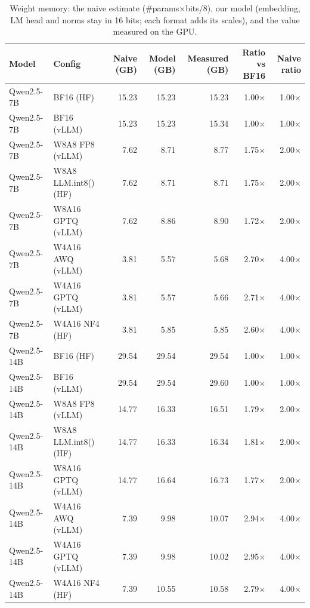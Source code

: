 \begin{table}[htbp]
\centering
\footnotesize
\caption{Weight memory: the naive estimate ($\#$params$\times$bits/8), our model (embedding, LM head and norms stay in 16 bits; each format adds its scales), and the value measured on the GPU.}
\label{tab:weights}
\setlength{\tabcolsep}{4pt}
\begin{tabular}{llrrrrr}
\toprule
Model & Config & Naive (GB) & Model (GB) & Measured (GB) & Ratio vs BF16 & Naive ratio \\
\midrule
Qwen2.5-7B & BF16 (HF) & 15.23 & 15.23 & 15.23 & 1.00$\times$ & 1.00$\times$ \\
Qwen2.5-7B & BF16 (vLLM) & 15.23 & 15.23 & 15.34 & 1.00$\times$ & 1.00$\times$ \\
Qwen2.5-7B & W8A8 FP8 (vLLM) & 7.62 & 8.71 & 8.77 & 1.75$\times$ & 2.00$\times$ \\
Qwen2.5-7B & W8A8 LLM.int8() (HF) & 7.62 & 8.71 & 8.71 & 1.75$\times$ & 2.00$\times$ \\
Qwen2.5-7B & W8A16 GPTQ (vLLM) & 7.62 & 8.86 & 8.90 & 1.72$\times$ & 2.00$\times$ \\
Qwen2.5-7B & W4A16 AWQ (vLLM) & 3.81 & 5.57 & 5.68 & 2.70$\times$ & 4.00$\times$ \\
Qwen2.5-7B & W4A16 GPTQ (vLLM) & 3.81 & 5.57 & 5.66 & 2.71$\times$ & 4.00$\times$ \\
Qwen2.5-7B & W4A16 NF4 (HF) & 3.81 & 5.85 & 5.85 & 2.60$\times$ & 4.00$\times$ \\
Qwen2.5-14B & BF16 (HF) & 29.54 & 29.54 & 29.54 & 1.00$\times$ & 1.00$\times$ \\
Qwen2.5-14B & BF16 (vLLM) & 29.54 & 29.54 & 29.60 & 1.00$\times$ & 1.00$\times$ \\
Qwen2.5-14B & W8A8 FP8 (vLLM) & 14.77 & 16.33 & 16.51 & 1.79$\times$ & 2.00$\times$ \\
Qwen2.5-14B & W8A8 LLM.int8() (HF) & 14.77 & 16.33 & 16.34 & 1.81$\times$ & 2.00$\times$ \\
Qwen2.5-14B & W8A16 GPTQ (vLLM) & 14.77 & 16.64 & 16.73 & 1.77$\times$ & 2.00$\times$ \\
Qwen2.5-14B & W4A16 AWQ (vLLM) & 7.39 & 9.98 & 10.07 & 2.94$\times$ & 4.00$\times$ \\
Qwen2.5-14B & W4A16 GPTQ (vLLM) & 7.39 & 9.98 & 10.02 & 2.95$\times$ & 4.00$\times$ \\
Qwen2.5-14B & W4A16 NF4 (HF) & 7.39 & 10.55 & 10.58 & 2.79$\times$ & 4.00$\times$ \\
\bottomrule
\end{tabular}
\end{table}
